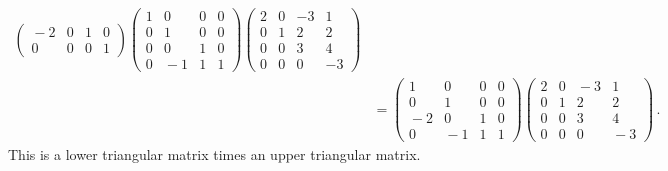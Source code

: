 \begin{example}
\begin{align*}
\begin{pmatrix}
\!-2&0&1&0\\
0&0&0&1
\end{pmatrix} 
\begin{pmatrix}
1&0&0&0\\
0&1&0&0\\
0&0&1&0\\
0&\!\!-1&1&1
\end{pmatrix}
\begin{pmatrix}
2&0&-3&1\\
0&1&2&2\\
0&0&3&4\\
0&0&0&-3
\end{pmatrix}
\\[2mm]
&=
\begin{pmatrix}
1&0&0&0\\
0&1&0&0\\
\!-2&0&1&0\\
0&\!\!-1&1&1
\end{pmatrix} 
%
\begin{pmatrix}
2&0&\!\!-3&1\\
0&1&2&2\\
0&0&3&4\\
0&0&0&\!\!-3
\end{pmatrix} \, .
\end{align*}
This is a lower triangular matrix times an upper triangular matrix. 
\end{example}

